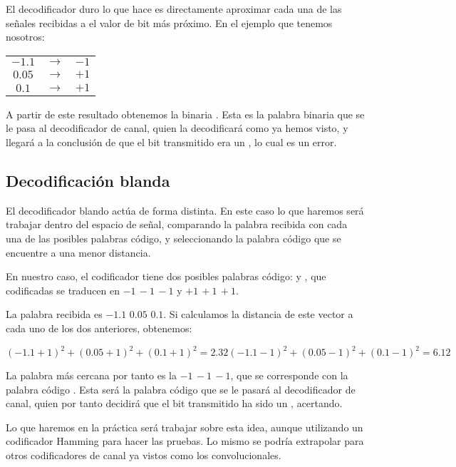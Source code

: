 \documentclass[es,practica,12pt]{uah}
\begin{document}
El decodificador duro lo que hace es directamente aproximar cada una de las señales recibidas a el valor de bit más próximo. En el ejemplo que tenemos nosotros:

\begin{tabular}{ccc}
	$-1.1$ & $\rightarrow$ & $-1$ \\
	$0.05$ & $\rightarrow$ & $+1$ \\
	$0.1$ & $\rightarrow$ & $+1$ \\
\end{tabular}

A partir de este resultado obtenemos la binaria . Esta es la palabra binaria que se le pasa al decodificador de canal, quien la decodificará como ya hemos visto, y llegará a la conclusión de que el bit transmitido era un , lo cual es un error.


\subsection{Decodificación blanda}

El decodificador blando actúa de forma distinta. En este caso lo que haremos será trabajar dentro del espacio de señal, comparando la palabra recibida con cada una de las posibles palabras código, y seleccionando la palabra código que se encuentre a una menor distancia. 

En nuestro caso, el codificador tiene dos posibles palabras código:  y , que codificadas se traducen en $-1 \, -1 \, -1$ y $+1 \, +1 \, +1$. 

La palabra recibida es $-1.1 \, \, 0.05 \, \, 0.1$. Si calculamos la distancia de este vector a cada uno de los dos anteriores, obtenemos:

\begin{displaymath}
(-1.1+1)^2 + (0.05+1)^2 + (0.1 +1)^2 = 2.32
(-1.1-1)^2 + (0.05-1)^2 + (0.1 -1)^2 = 6.12
\end{displaymath}

La palabra más cercana por tanto es la $-1 \, -1 \, -1$, que se corresponde con la palabra código . Esta será la palabra código que se le pasará al decodificador de canal, quien por tanto decidirá que el bit transmitido ha sido un , acertando.


Lo que haremos en la práctica será trabajar sobre esta idea, aunque utilizando un codificador Hamming para hacer las pruebas. Lo mismo se podría extrapolar para otros codificadores de canal ya vistos como los convolucionales. 
\end{document}
